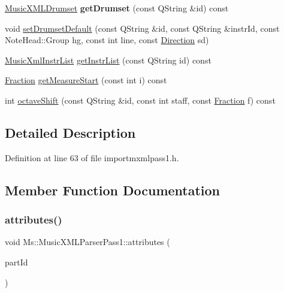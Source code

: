 \begin{DoxyCompactItemize}
\mbox{\label{class_ms_1_1_music_x_m_l_parser_pass1_a713f6335e2ada47a462fe0bd8cb5e606}} 
\hyperlink{namespace_ms_a568bb2597ab1d23e4660f255997223c2}{Music\+X\+M\+L\+Drumset} {\bfseries get\+Drumset} (const Q\+String \&id) const
\item 
void \hyperlink{class_ms_1_1_music_x_m_l_parser_pass1_a81d212ada3f56a8fecae2df6738caa5f}{set\+Drumset\+Default} (const Q\+String \&id, const Q\+String \&instr\+Id, const Note\+Head\+::\+Group hg, const int line, const \hyperlink{class_ms_1_1_direction}{Direction} sd)
\item 
\hyperlink{class_ms_1_1_music_xml_instr_list}{Music\+Xml\+Instr\+List} \hyperlink{class_ms_1_1_music_x_m_l_parser_pass1_acd7c9663585dd1f7c57df0536ecad9ac}{get\+Instr\+List} (const Q\+String id) const
\item 
\hyperlink{class_ms_1_1_fraction}{Fraction} \hyperlink{class_ms_1_1_music_x_m_l_parser_pass1_a0ec85fbb9c22925052c57bd5e93b6ce9}{get\+Measure\+Start} (const int i) const
\item 
int \hyperlink{class_ms_1_1_music_x_m_l_parser_pass1_a0c2e8987c30de0d646eef05e6ea7b7ec}{octave\+Shift} (const Q\+String \&id, const int staff, const \hyperlink{class_ms_1_1_fraction}{Fraction} f) const
\end{DoxyCompactItemize}


\subsection{Detailed Description}


Definition at line 63 of file importmxmlpass1.\+h.



\subsection{Member Function Documentation}
\mbox{\label{class_ms_1_1_music_x_m_l_parser_pass1_a39d323cd2ce91f10d41b1b5938bd3fab}} 
\subsubsection{\texorpdfstring{attributes()}{attributes()}}
{\footnotesize\ttfamily void Ms\+::\+Music\+X\+M\+L\+Parser\+Pass1\+::attributes (\begin{DoxyParamCaption}\item[{const Q\+String \&}]{part\+Id }\end{DoxyParamCaption})}

